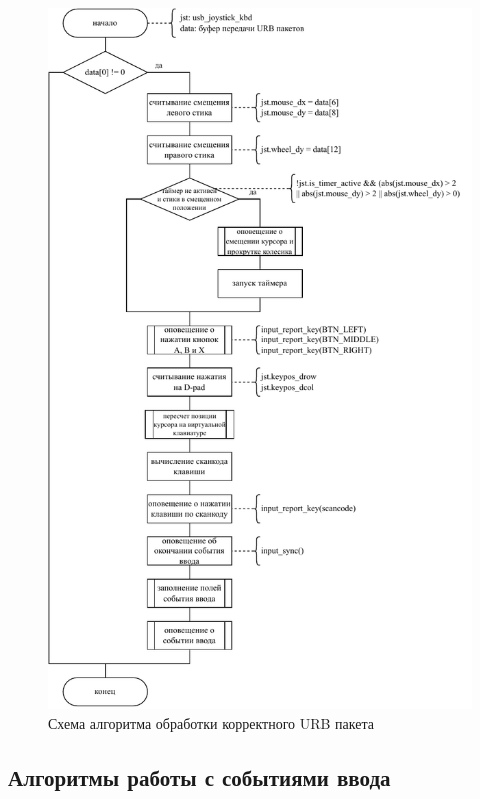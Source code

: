 \begin{figure}[ht]
    \centering
    \includegraphics[keepaspectratio,width=\linewidth,height=0.85\textheight]{img/urb-handle.pdf}
    \caption{Схема алгоритма обработки корректного URB пакета}
    \label{alg:urb-handle}
\end{figure}

\clearpage

\subsection{Алгоритмы работы с событиями ввода}

